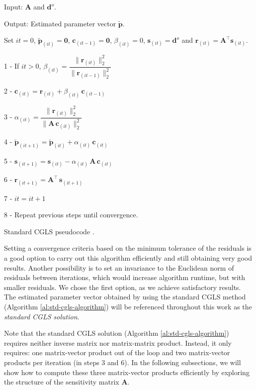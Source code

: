 \begin{algorithm}[H]
	Input: $\mathbf{A}$ and $\mathbf{d}^{o}$.
	
	Output: Estimated parameter vector $\tilde{\mathbf{p}}$.
	
	Set $it = 0$, $\tilde{\mathbf{p}}_{(it)} = \mathbf{0}$, $\mathbf{c}_{(it-1)} = \mathbf{0}$, $\beta_{(it)} = 0$, $\mathbf{s}_{(it)} = \mathbf{d}^{o}$ and $\mathbf{r}_{(it)} = \mathbf{A}^{\top} \mathbf{s}_{(it)}$.
	
	1 - If $it > 0$, $\beta_{(it)} = \dfrac{\| \mathbf{r}_{(it)} \|_{2}^{2}}{\| \mathbf{r}_{(it - 1)} \|_{2}^{2}}$
	
	2 - $\mathbf{c}_{(it)} = \mathbf{r}_{(it)} + \beta_{(it)} \, \mathbf{c}_{(it - 1)}$
	
	3 - $\alpha_{(it)} = \dfrac{{\| \mathbf{r}_{(it)}\|_{2}^{2}}}{\| \mathbf{A} \, \mathbf{c}_{(it)} \|_{2}^{2}}$
	
	4 - $\tilde{\mathbf{p}}_{(it + 1)} = \tilde{\mathbf{p}}_{(it)} + \alpha_{(it)} \, \mathbf{c}_{(it)}$
	
	5 - $\mathbf{s}_{(it + 1)} = \mathbf{s}_{(it)} - \alpha_{(it)} \, \mathbf{A} \, \mathbf{c}_{(it)}$
	
	6 - $\mathbf{r}_{(it + 1)} = \mathbf{A}^{\top} \, \mathbf{s}_{(it + 1)}$
	
	7 - $it = it + 1$
	
	8 - Repeat previous steps until convergence.
	
	\caption{Standard CGLS pseudocode \citep[][ p. 166]{aster2019parameter}.}
\label{al:std-cgls-algorithm}
\end{algorithm}

Setting a convergence criteria based on the minimum tolerance of the residuals is a good 
option to carry out this algorithm efficiently and still obtaining very good results. 
Another possibility is to set an invariance to the Euclidean norm of residuals between 
iterations, which would increase algorithm runtime, but with smaller residuals. 
We chose the first option, as we achieve satisfactory results. 
The estimated parameter vector obtained by using the standard CGLS method 
(Algorithm \ref{al:std-cgls-algorithm}) will be referenced throughout this work as 
the \textit{standard CGLS solution}.

Note that the standard CGLS solution (Algorithm \ref{al:std-cgls-algorithm}) requires 
neither inverse matrix nor matrix-matrix product. Instead, it only requires: one matrix-vector 
product out of the loop and two matrix-vector products per iteration (in steps 3 and 6). 
In the following subsections, we will show how to compute these three matrix-vector products 
efficiently by exploring the structure of the sensitivity matrix $\mathbf{A}$.


